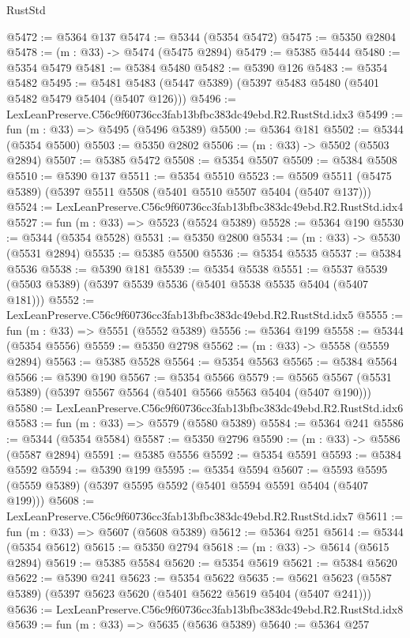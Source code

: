 \begin{lexlean}{RustStd}
\begin{coremodule}
@5472 := @5364 @137
@5474 := @5344 (@5354 @5472)
@5475 := @5350 @2804
@5478 := (m : @33) -> @5474 (@5475 @2894)
@5479 := @5385 @5444
@5480 := @5354 @5479
@5481 := @5384 @5480
@5482 := @5390 @126
@5483 := @5354 @5482
@5495 := @5481 @5483 (@5447 @5389) (@5397 @5483 @5480 (@5401 @5482 @5479 @5404 (@5407 @126)))
@5496 := LexLeanPreserve.C56c9f60736cc3fab13bfbc383dc49ebd.R2.RustStd.idx3
@5499 := fun (m : @33) => @5495 (@5496 @5389)
@5500 := @5364 @181
@5502 := @5344 (@5354 @5500)
@5503 := @5350 @2802
@5506 := (m : @33) -> @5502 (@5503 @2894)
@5507 := @5385 @5472
@5508 := @5354 @5507
@5509 := @5384 @5508
@5510 := @5390 @137
@5511 := @5354 @5510
@5523 := @5509 @5511 (@5475 @5389) (@5397 @5511 @5508 (@5401 @5510 @5507 @5404 (@5407 @137)))
@5524 := LexLeanPreserve.C56c9f60736cc3fab13bfbc383dc49ebd.R2.RustStd.idx4
@5527 := fun (m : @33) => @5523 (@5524 @5389)
@5528 := @5364 @190
@5530 := @5344 (@5354 @5528)
@5531 := @5350 @2800
@5534 := (m : @33) -> @5530 (@5531 @2894)
@5535 := @5385 @5500
@5536 := @5354 @5535
@5537 := @5384 @5536
@5538 := @5390 @181
@5539 := @5354 @5538
@5551 := @5537 @5539 (@5503 @5389) (@5397 @5539 @5536 (@5401 @5538 @5535 @5404 (@5407 @181)))
@5552 := LexLeanPreserve.C56c9f60736cc3fab13bfbc383dc49ebd.R2.RustStd.idx5
@5555 := fun (m : @33) => @5551 (@5552 @5389)
@5556 := @5364 @199
@5558 := @5344 (@5354 @5556)
@5559 := @5350 @2798
@5562 := (m : @33) -> @5558 (@5559 @2894)
@5563 := @5385 @5528
@5564 := @5354 @5563
@5565 := @5384 @5564
@5566 := @5390 @190
@5567 := @5354 @5566
@5579 := @5565 @5567 (@5531 @5389) (@5397 @5567 @5564 (@5401 @5566 @5563 @5404 (@5407 @190)))
@5580 := LexLeanPreserve.C56c9f60736cc3fab13bfbc383dc49ebd.R2.RustStd.idx6
@5583 := fun (m : @33) => @5579 (@5580 @5389)
@5584 := @5364 @241
@5586 := @5344 (@5354 @5584)
@5587 := @5350 @2796
@5590 := (m : @33) -> @5586 (@5587 @2894)
@5591 := @5385 @5556
@5592 := @5354 @5591
@5593 := @5384 @5592
@5594 := @5390 @199
@5595 := @5354 @5594
@5607 := @5593 @5595 (@5559 @5389) (@5397 @5595 @5592 (@5401 @5594 @5591 @5404 (@5407 @199)))
@5608 := LexLeanPreserve.C56c9f60736cc3fab13bfbc383dc49ebd.R2.RustStd.idx7
@5611 := fun (m : @33) => @5607 (@5608 @5389)
@5612 := @5364 @251
@5614 := @5344 (@5354 @5612)
@5615 := @5350 @2794
@5618 := (m : @33) -> @5614 (@5615 @2894)
@5619 := @5385 @5584
@5620 := @5354 @5619
@5621 := @5384 @5620
@5622 := @5390 @241
@5623 := @5354 @5622
@5635 := @5621 @5623 (@5587 @5389) (@5397 @5623 @5620 (@5401 @5622 @5619 @5404 (@5407 @241)))
@5636 := LexLeanPreserve.C56c9f60736cc3fab13bfbc383dc49ebd.R2.RustStd.idx8
@5639 := fun (m : @33) => @5635 (@5636 @5389)
@5640 := @5364 @257

\end{coremodule}
\end{lexlean}
